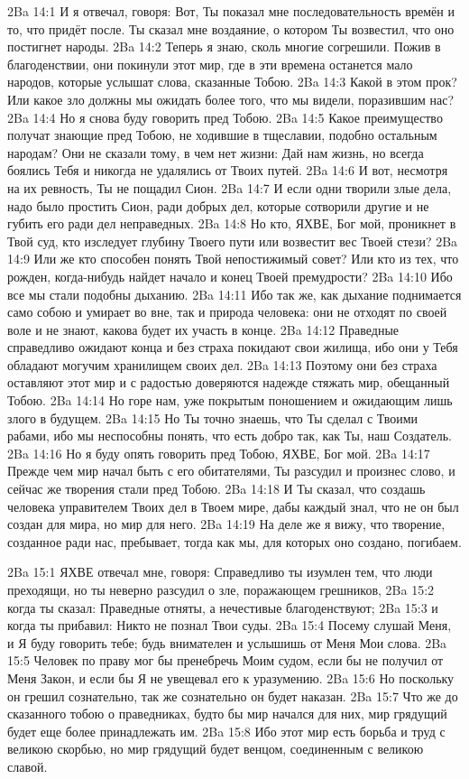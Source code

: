 \vs 2Ba 14:1
И я отвечал, говоря: Вот, Ты показал мне последовательность времён и то, что придёт после. Ты сказал мне воздаяние, о котором Ты возвестил, что оно постигнет народы.
\vs 2Ba 14:2
Теперь я знаю, сколь многие согрешили. Пожив в благоденствии, они покинули этот мир, где в эти времена останется мало народов, которые услышат слова, сказанные Тобою.
\vs 2Ba 14:3
Какой в этом прок? Или какое зло должны мы ожидать более того, что мы видели, поразившим нас?
\vs 2Ba 14:4
Но я снова буду говорить пред Тобою.
\vs 2Ba 14:5
Какое преимущество получат знающие пред Тобою, не ходившие в тщеславии, подобно остальным народам? Они не сказали тому, в чем нет жизни: Дай нам жизнь, но всегда боялись Тебя и никогда не удалялись от Твоих путей.
\vs 2Ba 14:6
И вот, несмотря на их ревность, Ты не пощадил Сион.
\vs 2Ba 14:7
И если одни творили злые дела, надо было простить Сион, ради добрых дел, которые сотворили другие и не губить его ради дел неправедных.
\vs 2Ba 14:8
Но кто, ЯХВЕ, Бог мой, проникнет в Твой суд, кто изследует глубину Твоего пути или возвестит вес Твоей стези?
\vs 2Ba 14:9
Или же кто способен понять Твой непостижимый совет? Или кто из тех, что рожден, когда-нибудь найдет начало и конец Твоей премудрости?
\vs 2Ba 14:10
Ибо все мы стали подобны дыханию.
\vs 2Ba 14:11
Ибо так же, как дыхание поднимается само собою и умирает во вне, так и природа человека: они не отходят по своей воле и не знают, какова будет их участь в конце.
\vs 2Ba 14:12
Праведные справедливо ожидают конца и без страха покидают свои жилища, ибо они у Тебя обладают могучим хранилищем своих дел.
\vs 2Ba 14:13
Поэтому они без страха оставляют этот мир и с радостью доверяются надежде стяжать мир, обещанный Тобою.
\vs 2Ba 14:14
Но горе нам, уже покрытым поношением и ожидающим лишь злого в будущем.
\vs 2Ba 14:15
Но Ты точно знаешь, что Ты сделал с Твоими рабами, ибо мы неспособны понять, что есть добро так, как Ты, наш Создатель.
\vs 2Ba 14:16
Но я буду опять говорить пред Тобою, ЯХВЕ, Бог мой.
\vs 2Ba 14:17
Прежде чем мир начал быть с его обитателями, Ты разсудил и произнес слово, и сейчас же творения стали пред Тобою.
\vs 2Ba 14:18
И Ты сказал, что создашь человека управителем Твоих дел в Твоем мире, дабы каждый знал, что не он был создан для мира, но мир для него.
\vs 2Ba 14:19
На деле же я вижу, что творение, созданное ради нас, пребывает, тогда как мы, для которых оно создано, погибаем.

\vs 2Ba 15:1
ЯХВЕ отвечал мне, говоря: Справедливо ты изумлен тем, что люди преходящи, но ты неверно разсудил о зле, поражающем грешников,
\vs 2Ba 15:2
когда ты сказал: Праведные отняты, а нечестивые благоденствуют;
\vs 2Ba 15:3
и когда ты прибавил: Никто не познал Твои суды.
\vs 2Ba 15:4
Посему слушай Меня, и Я буду говорить тебе; будь внимателен и услышишь от Меня Мои слова.
\vs 2Ba 15:5
Человек по праву мог бы пренебречь Моим судом, если бы не получил от Меня Закон, и если бы Я не увещевал его к уразумению.
\vs 2Ba 15:6
Но поскольку он грешил сознательно, так же сознательно он будет наказан.
\vs 2Ba 15:7
Что же до сказанного тобою о праведниках, будто бы мир начался для них, мир грядущий будет еще более принадлежать им.
\vs 2Ba 15:8
Ибо этот мир есть борьба и труд с великою скорбью, но мир грядущий будет венцом, соединенным с великою славой.

